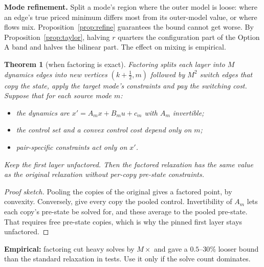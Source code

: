 \documentclass[11pt]{article}
\theoremstyle{plain}
\newtheorem{theorem}{Theorem}[section]
\theoremstyle{definition}
\theoremstyle{remark}
\begin{document}
\textbf{Mode refinement.} Split a mode's region where the outer model is loose: where an edge's true priced minimum differs most from its outer-model value, or where flows mix. Proposition~\ref{prop:refine} guarantees the bound cannot get worse. By Proposition~\ref{prop:taylor}, halving $r$ quarters the configuration part of the Option A band and halves the bilinear part. The effect on mixing is empirical.

\begin{theorem}[when factoring is exact]\label{thm:factor}
Factoring splits each layer into $M$ dynamics edges into new vertices $(k+\tfrac12,m)$ followed by $M^2$ switch edges that copy the state, apply the target mode's constraints and pay the switching cost. Suppose that for each source mode $m$:
\begin{itemize}[leftmargin=1.2em]
  \item the dynamics are $x'=A_mx+B_mu+c_m$ with $A_m$ invertible;
  \item the control set and a convex control cost depend only on $m$;
  \item pair-specific constraints act only on $x'$.
\end{itemize}
Keep the first layer unfactored. Then the factored relaxation has the same value as the original relaxation \emph{without} per-copy pre-state constraints.
\end{theorem}
\begin{proof}[Proof sketch]
Pooling the copies of the original gives a factored point, by convexity. Conversely, give every copy the pooled control. Invertibility of $A_m$ lets each copy's pre-state be solved for, and these average to the pooled pre-state. That requires free pre-state copies, which is why the pinned first layer stays unfactored.
\end{proof}
\textbf{Empirical:} factoring cut heavy solves by $M\times$ and gave a $0.5$--$30\%$ looser bound than the standard relaxation in tests. Use it only if the solve count dominates.

\end{document}
